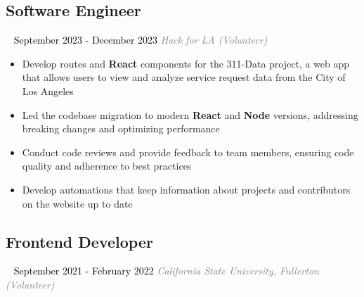\documentclass{article}
\newcommand{\resumesection}[3]{
    \subsection*{#1}
    \ 
    \normalsize
    \normalsize
    \hfill
    \textcolor{black}{#3}
    \normalsize
    \newline
    \small
    \textcolor{grey}{\emph{#2}}
}
\begin{document}
\resumesection{Software Engineer}{Hack for LA (Volunteer)}{September 2023 - December 2023}
\begin{itemize}
    \item Develop routes and \textbf{React} components for the 311-Data project, a web app that allows users to view and analyze service request data from the City of Los Angeles
    \item Led the codebase migration to modern \textbf{React} and \textbf{Node} versions, addressing breaking changes and optimizing performance
    \item Conduct code reviews and provide feedback to team members, ensuring code quality and adherence to best practices
    \item Develop automations that keep information about projects and contributors on the website up to date
\end{itemize}
\resumesection{Frontend Developer}{California State University, Fullerton (Volunteer)}{September 2021 - February 2022}
\end{document}
